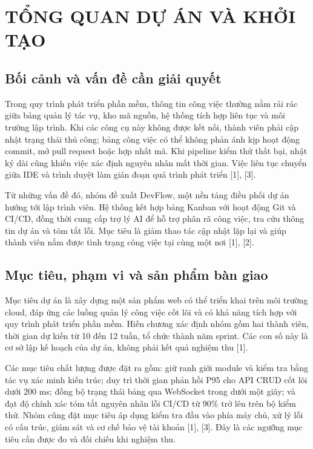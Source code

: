 \documentclass[12pt,a4paper]{report}
\begin{document}

\chapter{TỔNG QUAN DỰ ÁN VÀ KHỞI TẠO}
\section{Bối cảnh và vấn đề cần giải quyết}
Trong quy trình phát triển phần mềm, thông tin công việc thường nằm rải rác giữa bảng quản lý tác vụ, kho mã nguồn, hệ thống tích hợp liên tục và môi trường lập trình. Khi các công cụ này không được kết nối, thành viên phải cập nhật trạng thái thủ công; bảng công việc có thể không phản ánh kịp hoạt động commit, mở pull request hoặc hợp nhất mã. Khi pipeline kiểm thử thất bại, nhật ký dài cũng khiến việc xác định nguyên nhân mất thời gian. Việc liên tục chuyển giữa IDE và trình duyệt làm gián đoạn quá trình phát triển [1], [3].

Từ những vấn đề đó, nhóm đề xuất DevFlow, một nền tảng điều phối dự án hướng tới lập trình viên. Hệ thống kết hợp bảng Kanban với hoạt động Git và CI/CD, đồng thời cung cấp trợ lý AI để hỗ trợ phân rã công việc, tra cứu thông tin dự án và tóm tắt lỗi. Mục tiêu là giảm thao tác cập nhật lặp lại và giúp thành viên nắm được tình trạng công việc tại cùng một nơi [1], [2].

\section{Mục tiêu, phạm vi và sản phẩm bàn giao}
Mục tiêu dự án là xây dựng một sản phẩm web có thể triển khai trên môi trường cloud, đáp ứng các luồng quản lý công việc cốt lõi và có khả năng tích hợp với quy trình phát triển phần mềm. Hiến chương xác định nhóm gồm hai thành viên, thời gian dự kiến từ 10 đến 12 tuần, tổ chức thành năm sprint. Các con số này là cơ sở lập kế hoạch của dự án, không phải kết quả nghiệm thu [1].

Các mục tiêu chất lượng được đặt ra gồm: giữ ranh giới module và kiểm tra bằng tác vụ xác minh kiến trúc; duy trì thời gian phản hồi P95 cho API CRUD cốt lõi dưới 200 ms; đồng bộ trạng thái bảng qua WebSocket trong dưới một giây; và đạt độ chính xác tóm tắt nguyên nhân lỗi CI/CD từ 90\% trở lên trên bộ kiểm thử. Nhóm cũng đặt mục tiêu áp dụng kiểm tra đầu vào phía máy chủ, xử lý lỗi có cấu trúc, giám sát và cơ chế bảo vệ tài khoản [1], [3]. Đây là các ngưỡng mục tiêu cần được đo và đối chiếu khi nghiệm thu.
\end{document}
